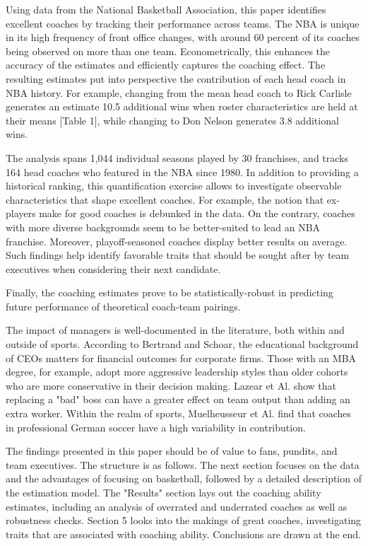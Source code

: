 \documentclass[main.tex]{subfiles}
\begin{document}
Using data from the National Basketball Association, this paper identifies excellent coaches by tracking their performance across teams. The NBA is unique in its high frequency of front office changes, with around 60 percent of its coaches being observed on more than one team. Econometrically, this enhances the accuracy of the estimates and efficiently captures the coaching effect. The resulting estimates put into perspective the contribution of each head coach in NBA history. For example, changing from the mean head coach to Rick Carlisle generates an estimate 10.5 additional wins when roster characteristics are held at their means [Table 1], while changing to Don Nelson generates 3.8 additional wins. 

The analysis spans 1,044 individual seasons played by 30 franchises, and tracks 164 head coaches who featured in the NBA since 1980. In addition to providing a historical ranking, this quantification exercise allows to investigate observable characteristics that shape excellent coaches. For example, the notion that ex-players make for good coaches is debunked in the data. On the contrary, coaches with more diverse backgrounds seem to be better-suited to lead an NBA franchise. Moreover, playoff-seasoned coaches display better results on average. Such findings help identify favorable traits that should be sought after by team executives when considering their next candidate. 

Finally, the coaching estimates prove to be statistically-robust in predicting future performance of theoretical coach-team pairings. 

The impact of managers is well-documented in the literature, both within and outside of sports. According to Bertrand and Schoar, the educational background of CEOs matters for financial outcomes for corporate firms. Those with an MBA degree, for example, adopt more aggressive leadership styles than older cohorts who are more conservative in their decision making. Lazear et Al. show that replacing a "bad" boss can have a greater effect on team output than adding an extra worker. Within the realm of sports, Muelheusseur et Al. find that coaches in professional German soccer have a high variability in contribution. 

The findings presented in this paper should be of value to fans, pundits, and team executives. The structure is as follows. The next section focuses on the data and the advantages of focusing on basketball, followed by a detailed description of the estimation model. The "Results" section lays out the coaching ability estimates, including an analysis of overrated and underrated coaches as well as robustness checks. Section 5 looks into the makings of great coaches, investigating traits that are associated with coaching ability. Conclusions are drawn at the end. 


 
\end{document}
